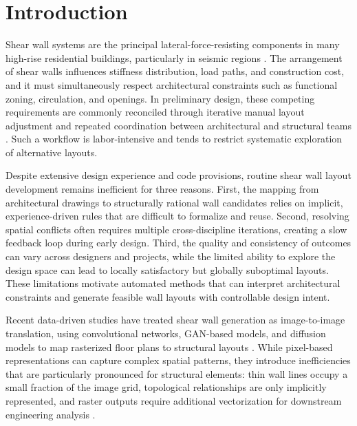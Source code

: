 \section{Introduction}
\label{sec:intro}

Shear wall systems are the principal lateral-force-resisting components in many high-rise residential buildings, particularly in seismic regions \cite{GB500112010Code2016,qianDesignTallBuilding2018}. The arrangement of shear walls influences stiffness distribution, load paths, and construction cost, and it must simultaneously respect architectural constraints such as functional zoning, circulation, and openings. In preliminary design, these competing requirements are commonly reconciled through iterative manual layout adjustment and repeated coordination between architectural and structural teams \cite{Steiner_2016,malaga-chuquitaypeMachineLearningStructural2022}. Such a workflow is labor-intensive and tends to restrict systematic exploration of alternative layouts.

Despite extensive design experience and code provisions, routine shear wall layout development remains inefficient for three reasons. First, the mapping from architectural drawings to structurally rational wall candidates relies on implicit, experience-driven rules that are difficult to formalize and reuse. Second, resolving spatial conflicts often requires multiple cross-discipline iterations, creating a slow feedback loop during early design. Third, the quality and consistency of outcomes can vary across designers and projects, while the limited ability to explore the design space can lead to locally satisfactory but globally suboptimal layouts. These limitations motivate automated methods that can interpret architectural constraints and generate feasible wall layouts with controllable design intent.

Recent data-driven studies have treated shear wall generation as image-to-image translation, using convolutional networks, GAN-based models, and diffusion models to map rasterized floor plans to structural layouts \cite{liaoAutomatedStructuralDesign2021a,liaoIntelligentGenerativeStructural2022a,luIntelligentStructuralDesign2022a,guIntelligentDesignShear2024,pizarroUseConvolutionalNetworks2021,zhaoIntelligentDesignShear2023,zhouStructDiffusionEndendIntelligent2024}. While pixel-based representations can capture complex spatial patterns, they introduce inefficiencies that are particularly pronounced for structural elements: thin wall lines occupy a small fraction of the image grid, topological relationships are only implicitly represented, and raster outputs require additional vectorization for downstream engineering analysis \cite{wangHighResolutionImageSynthesis2018,feiIntegratedSchematicDesign2022}.

